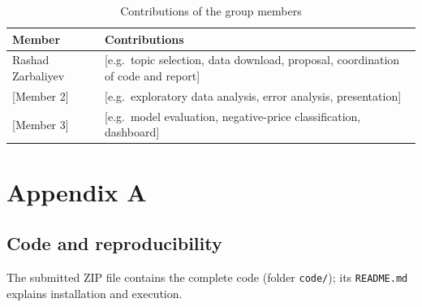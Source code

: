 \documentclass[12pt,oneside]{article}
\begin{document}
\begin{table}[!htbp]
    \centering
    \caption{Contributions of the group members}
    \begin{tabularx}{\textwidth}{lX}
        \toprule
        Member & Contributions \\
        \midrule
        Rashad Zarbaliyev & [e.g.\ topic selection, data download, proposal, coordination of code and report] \\
        {[Member 2]} & [e.g.\ exploratory data analysis, error analysis, presentation] \\
        {[Member 3]} & [e.g.\ model evaluation, negative-price classification, dashboard] \\
        \bottomrule
    \end{tabularx}
    \label{tab:contrib}
\end{table}



\clearpage
\lhead{}
\printbibliography
{}


\clearpage
\appendix
\section{Appendix A}

\subsection*{Code and reproducibility}

The submitted ZIP file contains the complete code (folder \texttt{code/}); its \texttt{README.md} explains installation and execution.
\end{document}
